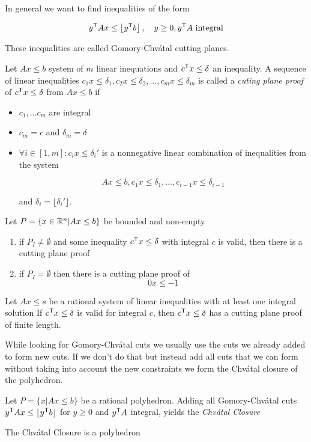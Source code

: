 In general we want to find inequalities of the form

\[{y}^\text{\upshape \sffamily T} A x \leq \left\lfloor {y}^\text{\upshape \sffamily T} b \right \rfloor,\quad y\geq 0, {y}^\text{\upshape \sffamily T} A \text{ integral}\]

These inequalities are called Gomory-Chv\'{a}tal cutting planes.

\begin{Def} Let $Ax\leq b$ system of $m$ linear inequations and ${c}^\text{\upshape \sffamily T}x\leq \delta$ an inequality. A sequence of linear inequalities $c_1x\leq \delta_1, c_2x\leq \delta_2,\ldots, c_mx\leq \delta_m$ is called a \emph{cuting plane proof} of ${c}^\text{\upshape \sffamily T} x\leq \delta$ from $Ax\leq b$ if
\begin{itemize}
\item $c_1,\ldots c_m$ are integral
\item $c_m=c$ and $\delta_m=\delta$
\item $\forall i\in [1,m]: c_ix\leq \delta_i'$ is a nonnegative linear combination of inequalities from the system

\[Ax\leq b, c_1x\leq \delta_1,\ldots,c_{i-1}x\leq \delta_{i-1}\]

and $\delta_i=\lfloor \delta_i'\rfloor$.
\end{itemize}
\end{Def}

\begin{thm}[Existence] Let $P=\{x\in \mathbb{R}^n | Ax\leq b\}$ be bounded and non-empty

\begin{enumerate}
\item if $P_I\neq \emptyset$ and some inequality ${c}^\text{\upshape \sffamily T} x\leq \delta$ with integral $c$ is valid, then there is a cutting plane proof
\item if $P_I=\emptyset$ then there is a cutting plane proof of 
\[0x\leq -1\]
\end{enumerate}
\end{thm}

\begin{thm} Let $Ax\leq s$ be a rational system of linear inequalities with at least one integral solution If ${c}^\text{\upshape \sffamily T}x\leq \delta$ is valid for integral $c$, then ${c}^\text{\upshape \sffamily T}x\leq \delta$ has a cutting plane proof of finite length.
\end{thm}

While looking for Gomory-Chv\'{a}tal cuts we usually use the cuts we already added to form new cuts. If we don't do that but instead add all cuts that we can form without taking into account the new constraints we form the Chv\'{a}tal closure of the polyhedron.

\begin{Def} Let $P=\{x|Ax\leq b\}$ be a rational polyhedron. Adding all Gomory-Chv\'{a}tal cuts ${y}^\text{\upshape \sffamily T}Ax\leq \lfloor {y}^\text{\upshape \sffamily T} b\rfloor$ for $y\geq 0$ and ${y}^\text{\upshape \sffamily T} A$ integral, yields the \emph{Chv\'{a}tal Closure}
\end{Def}

\begin{thm} The Chv\'{a}tal Closure is a polyhedron\end{thm}